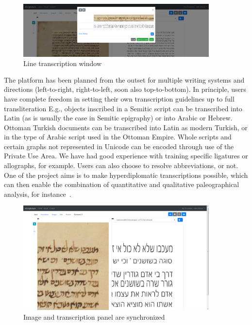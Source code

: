 \begin{figure}
	\centering
	\includegraphics[width=0.9\textwidth]{transcription_window.png}
	\caption{Line transcription window}
	\label{fig_ost:transcription}
\end{figure}

The platform has been planned from the outset for multiple writing systems and
directions (left-to-right, right-to-left, soon also top-to-bottom). In
principle, users have complete freedom in setting their own transcription
guidelines up to full transliteration E.g., objects inscribed in a Semitic
script can be transcribed into Latin (as is usually the case in Semitic
epigraphy) or into Arabic or Hebrew. Ottoman Turkish documents can be
transcribed into Latin as modern Turkish, or in the type of Arabic script used
in the Ottoman Empire.  Whole scripts and certain graphs not represented in
Unicode can be encoded through use of the Private Use Area. We have had good
experience with training specific ligatures or allographs, for example. Users
can also choose to resolve abbreviations, or not. One of the project aims is to
make hyperdiplomatic transcriptions possible, which can then enable the
combination of quantitative and qualitative paleographical analysis, for
instance~\cite{kiessling2019escripta}.

\begin{figure}
	\centering
	\includegraphics[width=0.9\textwidth]{zoom.png}
	\caption{Image and transcription panel are synchronized}
	\label{fig_ost:zoom}
\end{figure}

